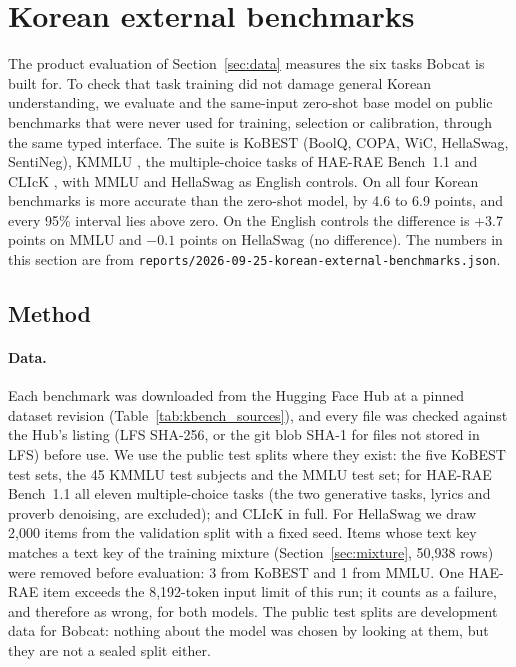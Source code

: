 \section{Korean external benchmarks}
\label{sec:kbench}

The product evaluation of Section~\ref{sec:data} measures the six tasks Bobcat is built for.
To check that task training did not damage general Korean understanding, we evaluate \expone{}
and the same-input zero-shot base model on public benchmarks that were never used for
training, selection or calibration, through the same typed interface. The suite is KoBEST
\citep{kim2022kobest} (BoolQ, COPA, WiC, HellaSwag, SentiNeg), KMMLU \citep{son2024kmmlu},
the multiple-choice tasks of HAE-RAE Bench~1.1 \citep{son2023haerae} and CLIcK
\citep{kim2024click}, with MMLU \citep{hendrycks2021mmlu} and HellaSwag
\citep{zellers2019hellaswag} as English controls. On all four Korean benchmarks \expone{} is
more accurate than the zero-shot model, by 4.6 to 6.9 points, and every 95\% interval lies
above zero. On the English controls the difference is +3.7 points on MMLU and $-0.1$ points
on HellaSwag (no difference). The numbers in this section are from
\texttt{reports/2026-09-25-korean-external-benchmarks.json}.

\subsection{Method}

\paragraph{Data.}
Each benchmark was downloaded from the Hugging Face Hub at a pinned dataset revision
(Table~\ref{tab:kbench_sources}), and every file was checked against the Hub's listing (LFS
SHA-256, or the git blob SHA-1 for files not stored in LFS) before use. We use the public
test splits where they exist: the five KoBEST test sets, the 45 KMMLU test subjects and the
MMLU test set; for HAE-RAE Bench~1.1 all eleven multiple-choice tasks (the two generative
tasks, lyrics and proverb denoising, are excluded); and CLIcK in full. For HellaSwag we
draw 2,000 items from the validation split with a fixed seed. Items whose text key matches a
text key of the \expone{} training mixture (Section~\ref{sec:mixture}, 50,938 rows) were
removed before evaluation: 3 from KoBEST and 1 from MMLU. One HAE-RAE item exceeds the
8,192-token input limit of this run; it counts as a failure, and therefore as wrong, for both
models. The public test splits are development data for Bobcat: nothing about the model
was chosen by looking at them, but they are not a sealed split either.

